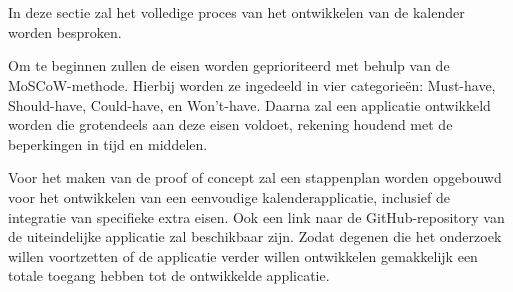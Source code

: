 
\chapter{}%
\label{ch:methodologie}


In deze sectie zal het volledige proces van het ontwikkelen van de kalender worden besproken. \newline

Om te beginnen zullen de eisen worden geprioriteerd met behulp van de MoSCoW-methode. Hierbij worden ze ingedeeld in vier categorieën: Must-have, Should-have, Could-have, en Won't-have. Daarna zal een applicatie ontwikkeld worden die grotendeels aan deze eisen voldoet, rekening houdend met de beperkingen in tijd en middelen. \newline

Voor het maken van de proof of concept zal een stappenplan worden opgebouwd voor het ontwikkelen van een eenvoudige kalenderapplicatie, inclusief de integratie van specifieke extra eisen. Ook een link naar de GitHub-repository van de uiteindelijke applicatie zal beschikbaar zijn. Zodat degenen die het onderzoek willen voortzetten of de applicatie verder willen ontwikkelen gemakkelijk een totale toegang hebben tot de ontwikkelde applicatie.

